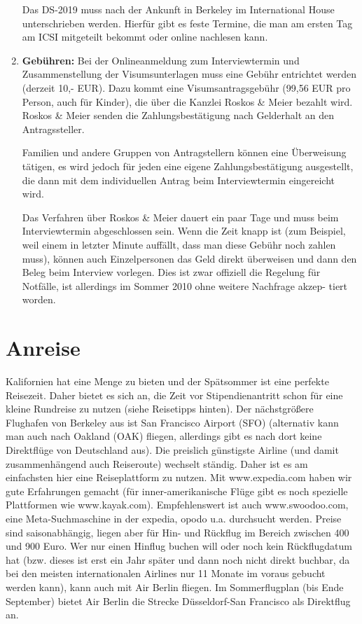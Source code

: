 \documentclass[a4paper]{scrreprt}
\begin{document}
\begin{enumerate}
	Das DS-2019 muss nach der Ankunft in Berkeley im International House unterschrieben werden. Hierfür gibt es feste Termine, die man am ersten Tag am ICSI mitgeteilt bekommt oder online nachlesen kann.

	\item \textbf{Gebühren:} Bei der Onlineanmeldung zum Interviewtermin und Zusammenstellung der Visumsunterlagen muss eine Gebühr entrichtet werden (derzeit 10,- EUR). Dazu kommt eine Visumsantragsgebühr (99,56 EUR pro Person, auch für Kinder), die über die Kanzlei Roskos \& Meier bezahlt wird. Roskos \& Meier senden die Zahlungsbestätigung nach Gelderhalt an den Antragssteller.

	Familien und andere Gruppen von Antragstellern können eine Überweisung tätigen, es wird jedoch für jeden eine eigene Zahlungsbestätigung ausgestellt, die dann mit dem individuellen Antrag beim Interviewtermin eingereicht wird.
	
	Das Verfahren über Roskos \& Meier dauert ein paar Tage und muss beim Interviewtermin abgeschlossen sein. Wenn die Zeit knapp ist (zum Beispiel, weil einem in letzter Minute auffällt, dass man diese Gebühr noch zahlen muss), können auch Einzelpersonen das Geld direkt überweisen und dann den Beleg beim Interview vorlegen. Dies ist zwar offiziell die Regelung für Notfälle, ist allerdings im Sommer 2010 ohne weitere Nachfrage akzep- tiert worden.
	
\end{enumerate}

\section{Anreise}

Kalifornien hat eine Menge zu bieten und der Spätsommer ist eine perfekte Reisezeit. Daher bietet es sich an, die Zeit vor Stipendienantritt schon für eine kleine Rundreise zu nutzen (siehe Reisetipps hinten). Der nächstgrößere Flughafen von Berkeley aus ist San Francisco Airport (SFO)  (alternativ kann man auch nach Oakland (OAK) fliegen, allerdings gibt es nach dort keine Direktflüge von Deutschland aus). Die preislich günstigste Airline (und damit zusammenhängend auch Reiseroute) wechselt ständig. Daher ist es am einfachsten hier eine Reiseplattform zu nutzen. Mit www.expedia.com haben wir gute Erfahrungen gemacht (für inner-amerikanische Flüge gibt es noch spezielle Plattformen wie  www.kayak.com). Empfehlenswert ist auch  www.swoodoo.com, eine Meta-Suchmaschine in der expedia, opodo u.a. durchsucht werden. Preise sind saisonabhängig, liegen aber für Hin- und Rückflug im Bereich zwischen 400 und 900 Euro. Wer nur einen Hinflug buchen will oder noch kein Rückflugdatum hat (bzw. dieses ist erst ein Jahr später und dann noch nicht direkt buchbar, da bei den meisten internationalen Airlines nur 11 Monate im voraus gebucht werden kann), kann auch mit Air Berlin fliegen. Im Sommerflugplan (bis Ende September) bietet Air Berlin die Strecke Düsseldorf-San Francisco als Direktflug an.
\end{document}
